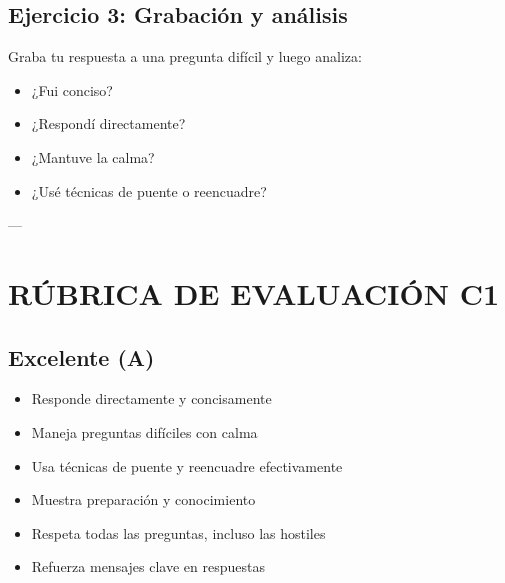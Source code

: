 \documentclass[a4paper,11pt]{article}
\begin{document}
\vspace{0.2cm}

\subsection{Ejercicio 3: Grabación y análisis}

Graba tu respuesta a una pregunta difícil y luego analiza:

\begin{itemize}

  \item ¿Fui conciso?

  \item ¿Respondí directamente?

  \item ¿Mantuve la calma?

  \item ¿Usé técnicas de puente o reencuadre?

\end{itemize}

\vspace{0.2cm}

---

\vspace{0.2cm}

\section{RÚBRICA DE EVALUACIÓN C1}

\vspace{0.2cm}

\subsection{Excelente (A)}

\begin{itemize}

  \item Responde directamente y concisamente

  \item Maneja preguntas difíciles con calma

  \item Usa técnicas de puente y reencuadre efectivamente

  \item Muestra preparación y conocimiento

  \item Respeta todas las preguntas, incluso las hostiles

  \item Refuerza mensajes clave en respuestas

\end{itemize}
\end{document}
